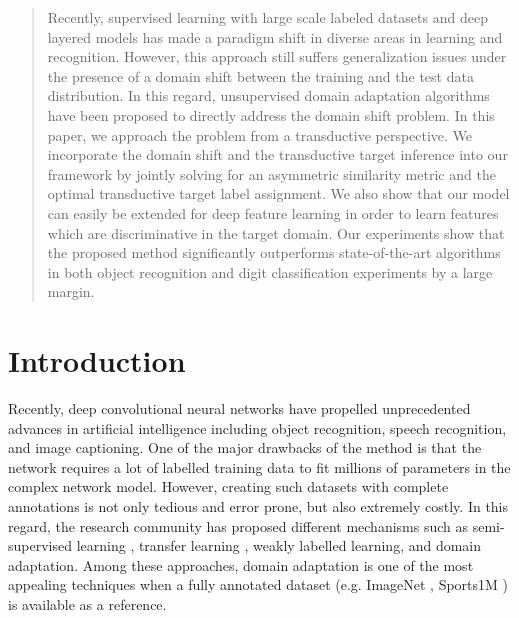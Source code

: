 \documentclass{article}
\begin{document}
\begin{abstract} 
Recently, supervised learning with large scale labeled datasets and deep layered models has made a paradigm shift in diverse areas in learning and recognition. However, this approach still suffers generalization issues under the presence of a domain shift between the training and the test data distribution. In this regard, unsupervised domain adaptation algorithms have been proposed to directly address the domain shift problem. In this paper, we approach the problem from a transductive perspective. We incorporate the domain shift and the transductive target inference into our framework by jointly solving for an asymmetric similarity metric and the optimal transductive target label assignment. We also show that our model can easily be extended for deep feature learning in order to learn features which are discriminative in the target domain. Our experiments show that the proposed method significantly outperforms state-of-the-art algorithms in both object recognition and digit classification experiments by a large margin.
\end{abstract} 

\section{Introduction}
\label{intro}
Recently, deep convolutional neural networks \cite{alexnet, vggnet, googlenet} have propelled unprecedented advances in artificial intelligence including object recognition, speech recognition, and image captioning. One of the major drawbacks of the method is that the network requires a lot of labelled training data to fit millions of parameters in the complex network model. However, creating such datasets with complete annotations is not only tedious and error prone, but also extremely costly. In this regard, the research community has proposed different mechanisms such as semi-supervised learning \cite{semisup1,semisup2,semisup3}, transfer learning \cite{transfer1, transfer2}, weakly labelled learning, and domain adaptation. Among these approaches, domain adaptation is one of the most appealing techniques when a fully annotated dataset (e.g. ImageNet \cite{ImageNet}, Sports1M \cite{sports1m}) is available as a reference. 
\end{document}
